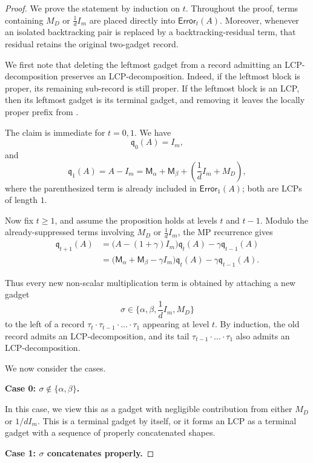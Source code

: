 \documentclass[12pt]{article}
\def \al {\alpha}
\newcommand{\cm}{\mathsf{M} }
\newcommand{\q}{\mathfrak q}
\begin{document}
\begin{proof}
We prove the statement by induction on \(t\). Throughout the proof, terms
containing \(M_D\) or \(\frac1d I_m\) are placed directly into
\(\mathsf{Error}_t(A)\). Moreover, whenever an isolated backtracking pair
is replaced by a backtracking-residual term, that residual retains the
original two-gadget record.

We first note that deleting the leftmost gadget from a record admitting an
LCP-decomposition preserves an LCP-decomposition. Indeed, if the leftmost
block is proper, its remaining sub-record is still proper. If the leftmost
block is an LCP, then its leftmost gadget is its terminal gadget, and
removing it leaves the locally proper prefix from
.

The claim is immediate for \(t=0,1\). We have
\[
    \q_0(A)=I_m,
\]
and
\[
    \q_1(A)
    =
    A-I_m
    =
    \cm_\alpha+\cm_\beta
    +
    \left(\frac1d I_m+M_D\right),
\]
where the parenthesized term is already included in
\(\mathsf{Error}_1(A)\); both are LCPs of length $1$.

Now fix \(t\geq1\), and assume the proposition holds at levels \(t\) and
\(t-1\). Modulo the already-suppressed terms involving \(M_D\) or
\(\frac1d I_m\), the MP recurrence gives
\begin{align*}
    \q_{t+1}(A)
    &=
    \bigl(A-(1+\gamma)I_m\bigr)\q_t(A)
    -
    \gamma\q_{t-1}(A) \\
    &=
    \bigl(\cm_\alpha+\cm_\beta-\gamma I_m\bigr)\q_t(A)
    -
    \gamma\q_{t-1}(A).
\end{align*}

Thus every new non-scalar multiplication term is obtained by attaching a
new gadget
\[
    \sigma\in \{\alpha,\beta, \frac{1}{d} I_m, M_D\} 
\]
to the left of a record
\(
    \tau_t\cdot\tau_{t-1}\cdot\dots\cdot\tau_1
\)
appearing at level \(t\). By induction, the old record admits an LCP-decomposition, and its tail
\(
    \tau_{t-1}\cdot\dots\cdot\tau_1
\)
also admits an LCP-decomposition. 

We now consider the cases.

\medskip
\noindent
\textbf{Case 0: \(\sigma \notin \{\al,\beta\} \).} 

In this case, we view this as a gadget with negligible contribution from either $M_D$ or $1/d I_m$. This is a terminal gadget by itself, or it forms an LCP as a terminal gadget with a sequence of properly concatenated shapes.

\medskip
\noindent
\textbf{Case 1: \(\sigma\) concatenates properly.}


\end{proof}
\end{document}
